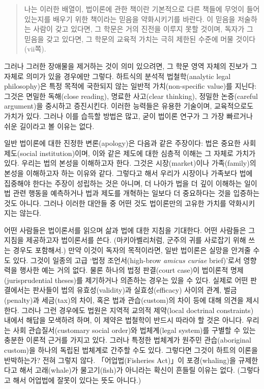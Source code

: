 \documentclass[12pt, oneside]{book}  %
\begin{document}
\begin{quote}
나는 이러한 배열이, 법이론에 관한 책이란 기본적으로 다른 책들에 무엇이
들어 있는지를 배우기 위한 책이라는 믿음을 약화시키기를 바란다. 이 믿음을
저술하는 사람이 갖고 있다면, 그 학문은 거의 진전을 이루지 못할 것이며,
독자가 그 믿음을 갖고 있다면, 그 학문의 교육적 가치는 극히 제한된 수준에
머물 것이다 (vii쪽).
\end{quote}

그러나 그러한 장애물을 제거하는 것이 의미 있으려면, 그 학문 영역 자체의
진보가 그 자체로 의미가 있을 경우에만 그렇다. 하트식의 분석적
법철학(analytic legal philosophy)은 특정 목적에 국한되지 않는 일반적
가치(non-specific value)를 지닌다: 그것은 면밀한 독해(close reading),
명료한 사고(clear thinking), 정밀한 논증(careful argument)을 중시하고
증진시킨다. 이러한 능력들은 유용한 기술이며, 교육적으로도 가치가 있다.
그러나 이를 습득할 방법은 많고, 굳이 법이론 연구가 그 가장 빠르거나 쉬운
길이라고 볼 이유는 없다.

일반 법이론에 대한 진정한 변론(apology)은 다음과 같은 주장이다: 법은
중요한 사회 제도(social institution)이며, 이와 같은 제도에 대한 심층적
이해는 그 자체로 가치가 있다. 우리는 법의 본성을 이해하고자 한다. 그것은
시장(market)이나 가족(family)의 본성을 이해하고자 하는 이유와 같다.
그렇다고 해서 우리가 시장이나 가족보다 법에 집중해야 한다는 주장이
성립하는 것은 아니며, 더 나아가 법을 더 깊이 이해하는 일이 법 관련
행동을 예측하거나 법과 제도를 개혁하는 일보다 더 중요하다는 것을
입증하는 것도 아니다. 그러나 이러한 대안들 중 어떤 것도 법이론만의
고유한 가치를 약화시키지는 않는다.

어떤 사람들은 법이론서를 읽으며 삶과 법에 대한 지침을 기대한다. 어떤
사람들은 그 지침을 제공하고자 법이론서를 쓴다. (마키아벨리처럼, 군주의
귀를 사로잡기 위해 쓰는 경우도 포함해서.) 만약 이것이 독자의 목적이라면,
일반 법이론은 실망을 안겨줄 수도 있다. 그것이 일종의 고급 `법정
조언서(high-brow \emph{amicus curiae} brief)'로서 영향력을 행사한 예는
거의 없다. 물론 하나의 법정 판결(court case)이 법이론적
명제(jurisprudential theses)를 제기하거나 의존하는 경우는 있을 수 있다.
실제로 어떤 판결에서는 판사들이 법의 유효성(validity)과 실효성(efficacy)
사이의 관계, 벌금(penalty)과 세금(tax)의 차이, 혹은 법과 관습(custom)의
차이 등에 대해 의견을 제시한다. 그러나 그런 경우에도 법원은 지역적
교의적 제약(local doctrinal constraints) 내에서 해답을 모색하려 하며, 이
제약은 법철학이 반드시 따라야 할 것은 아니다. 우리는 사회
관습질서(customary social order)와 법체계(legal system)를 구별할 수 있는
충분한 이론적 근거를 가지고 있다. 그러나 특정한 법체계가 원주민
관습(aboriginal custom)을 하나의 독립된 법체계로 간주할 수도 있다.
그렇다면 그것이 하트의 이론을 반박하는가? 전혀 그렇지 않다.
「어업법(Fisheries Act)」이 포경(whaling)을 규제한다고 해서
고래(whale)가 물고기(fish)가 아니라는 확신이 흔들릴 이유는 없다.
(그렇다고 해서 어업법에 잘못이 있다는 뜻도 아니다.)
\end{document}
